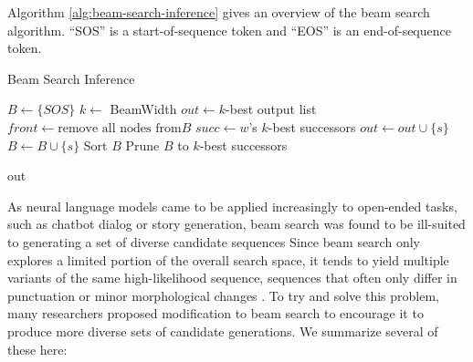 Algorithm \ref{alg:beam-search-inference} gives an overview of the beam search algorithm. 
``SOS'' is a start-of-sequence token and ``EOS'' is an end-of-sequence token.

\begin{algorithm}
\caption{Beam Search Inference}
\label{alg:beam-search-inference}

\begin{algorithmic}[1]
\State $B \gets \{SOS\}$
\State $k \gets $ BeamWidth
\State $out \gets k$-best output list
    \State $front \gets \text{remove all nodes from} B$
    \State $succ \gets w$'s $k$-best successors
        \State $out \gets out \cup \{s\}$
    \Else
        \State $B \gets B \cup \{s\}$
    \EndIf
    \EndFor
    \EndFor
    \State Sort $B$
        \State Prune $B$ to $k$-best successors
    \EndIf
\EndWhile

\Return out
\EndProcedure
\end{algorithmic}
\end{algorithm}

As neural language models came to be applied increasingly to open-ended tasks, such as chatbot dialog or story generation, beam search was found to be ill-suited to generating a set of diverse candidate sequences
Since beam search only explores a limited portion of the overall search space, it tends to yield multiple variants of the same high-likelihood sequence, sequences that often only differ in punctuation or minor morphological changes \cite{li2016mutual}.  
To try and solve this problem, many researchers proposed modification to beam search to encourage it to produce more diverse sets of candidate generations.
We summarize several of these here:

